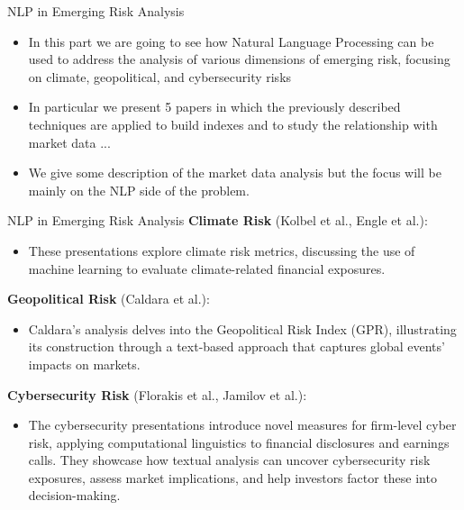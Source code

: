 \documentclass[11pt]{beamer}
\begin{document}
\begin{frame}{NLP in Emerging Risk Analysis}
	\begin{itemize}
		\item In this part we are going to see how Natural Language Processing can be used to address the analysis of various dimensions of emerging risk, focusing on climate, geopolitical, and cybersecurity risks

		\item In particular we present 5 papers in which the previously described techniques are applied to build indexes and to study the relationship with market data ...

		\item We give some description of the market data analysis but the focus will be mainly on the NLP side of the problem.
	\end{itemize}
\end{frame}
\begin{frame}{NLP in Emerging Risk Analysis}
\textbf{Climate Risk} (Kolbel et al., Engle et al.): 

	\begin{itemize}
		\item These presentations explore climate risk metrics, discussing the use of machine learning to evaluate climate-related financial exposures. 

	\end{itemize}
\textbf{Geopolitical Risk} (Caldara et al.): 

	\begin{itemize}
		\item Caldara's analysis delves into the Geopolitical Risk Index (GPR), illustrating its construction through a text-based approach that captures global events' impacts on markets. 

	\end{itemize}
\textbf{Cybersecurity Risk} (Florakis et al.,  Jamilov et al.): 

	\begin{itemize}
		\item The cybersecurity presentations introduce novel measures for firm-level cyber risk, applying computational linguistics to financial disclosures and earnings calls. They showcase how textual analysis can uncover cybersecurity risk exposures, assess market implications, and help investors factor these into decision-making.
	\end{itemize}
\end{frame}
\end{document}
